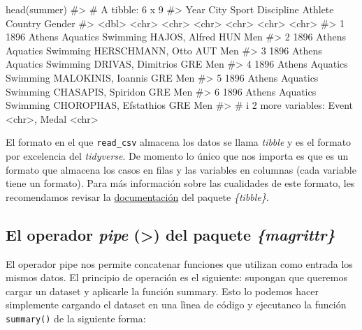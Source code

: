 \documentclass[
  letterpaper,
  DIV=11,
  numbers=noendperiod,
  oneside]{scrreprt}
\newenvironment{Shaded}{\begin{snugshade}}{\end{snugshade}}
\newcommand{\CommentTok}[1]{\textcolor[rgb]{0.37,0.37,0.37}{#1}}
\newcommand{\FunctionTok}[1]{\textcolor[rgb]{0.28,0.35,0.67}{#1}}
\newcommand{\NormalTok}[1]{\textcolor[rgb]{0.00,0.23,0.31}{#1}}
\begin{document}
\begin{Shaded}
\begin{Highlighting}[]
\FunctionTok{head}\NormalTok{(summer)}
\CommentTok{\#\textgreater{} \# A tibble: 6 x 9}
\CommentTok{\#\textgreater{}    Year City   Sport    Discipline Athlete               Country Gender}
\CommentTok{\#\textgreater{}   \textless{}dbl\textgreater{} \textless{}chr\textgreater{}  \textless{}chr\textgreater{}    \textless{}chr\textgreater{}      \textless{}chr\textgreater{}                 \textless{}chr\textgreater{}   \textless{}chr\textgreater{} }
\CommentTok{\#\textgreater{} 1  1896 Athens Aquatics Swimming   HAJOS, Alfred         HUN     Men   }
\CommentTok{\#\textgreater{} 2  1896 Athens Aquatics Swimming   HERSCHMANN, Otto      AUT     Men   }
\CommentTok{\#\textgreater{} 3  1896 Athens Aquatics Swimming   DRIVAS, Dimitrios     GRE     Men   }
\CommentTok{\#\textgreater{} 4  1896 Athens Aquatics Swimming   MALOKINIS, Ioannis    GRE     Men   }
\CommentTok{\#\textgreater{} 5  1896 Athens Aquatics Swimming   CHASAPIS, Spiridon    GRE     Men   }
\CommentTok{\#\textgreater{} 6  1896 Athens Aquatics Swimming   CHOROPHAS, Efstathios GRE     Men   }
\CommentTok{\#\textgreater{} \# i 2 more variables: Event \textless{}chr\textgreater{}, Medal \textless{}chr\textgreater{}}
\end{Highlighting}
\end{Shaded}

El formato en el que \texttt{read\_csv} almacena los datos se llama
\emph{tibble} y es el formato por excelencia del \emph{tidyverse}. De
momento lo único que nos importa es que es un formato que almacena los
casos en filas y las variables en columnas (cada variable tiene un
formato). Para más información sobre las cualidades de este formato, les
recomendamos revisar la
\href{https://tibble.tidyverse.org/}{documentación} del paquete
\emph{\{tibble\}}.

\hypertarget{el-operador-pipe-del-paquete-magrittr}{%
\subsection{\texorpdfstring{El operador \emph{pipe}
(\textbar\textgreater) del paquete
\emph{\{magrittr\}}}{El operador pipe (\textbar\textgreater) del paquete \{magrittr\}}}\label{el-operador-pipe-del-paquete-magrittr}}

El operador pipe nos permite concatenar funciones que utilizan como
entrada los mismos datos. El principio de operación es el siguiente:
supongan que queremos cargar un dataset y aplicarle la función summary.
Esto lo podemos hacer simplemente cargando el dataset en una lìnea de
código y ejecutanco la función \texttt{summary()} de la siguiente forma:
\end{document}
